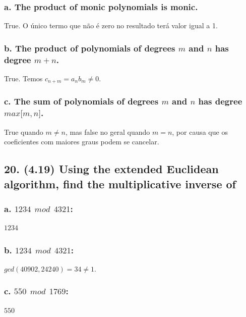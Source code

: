 \documentclass[fleqn, 12pt]{article}
\begin{document}
  \subsubsection*{a. The product of monic polynomials is monic.}

    True. O único termo que não é zero no resultado terá valor igual a 1.

  \subsubsection*{b. The product of polynomials of degrees $m$ and $n$ has
  degree $m + n$.}

    True. Temos $c_{n + m} = a_nb_m \neq 0$.

  \subsubsection*{c. The sum of polynomials of degrees $m$ and $n$ has degree
  $max \lbrack m, n \rbrack$.}

    True quando $m \ne n$, mas false no geral quando $m = n$, por causa que os
    coeficientes com maiores graus podem se cancelar.

\subsection*{20. (4.19) Using the extended Euclidean algorithm, find the
multiplicative inverse of}

  \subsubsection*{a. $1234 \ \ mod \ \ 4321$:}

    $1234$

  \subsubsection*{b. $1234 \ \ mod \ \ 4321$:}

    $gcd(40902, 24240) = 34 \ne 1$.

  \subsubsection*{c. $550 \ \ mod \ \ 1769$:}

    $550$
\end{document}
